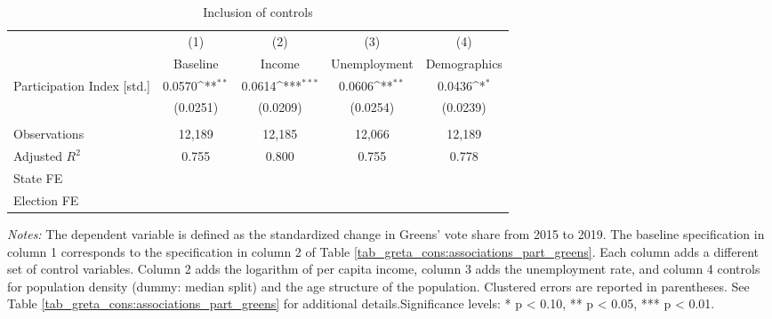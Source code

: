 \begin{table}[H]\centering
	\begin{threeparttable}
		\caption{Inclusion of controls}\label{tab_greta_cons:inclusion_controls}
		{\def\sym#1{\ifmmode^{#1}\else\(^{#1}\)\fi} 
			\begin{tabular}{l*{4}{c}}
				\toprule
				&\multicolumn{1}{c}{(1)}&\multicolumn{1}{c}{(2)}&\multicolumn{1}{c}{(3)}&\multicolumn{1}{c}{(4)}\\
				& Baseline & Income & Unemployment &  Demographics \\
				\midrule
			  Participation Index [std.]&      0.0570\sym{**} &      0.0614\sym{***}&      0.0606\sym{**} &      0.0436\sym{*}  \\
										&    (0.0251)         	&    (0.0209)         &    (0.0254)         &    (0.0239)         \\
				\\
				Observations        	&      12,189         &      12,185         &      12,066         &      12,189         \\
				Adjusted $R^2$         	&       0.755         &       0.800         &       0.755         &       0.778         \\			
				State FE				& \checkmark 		  & \checkmark       & \checkmark 	& \checkmark \\
				Election FE				& \checkmark 		  & \checkmark       & \checkmark   & \checkmark \\
				\bottomrule
		\end{tabular}}
		\begin{tablenotes} 
			\item \scriptsize \emph{Notes:} The dependent variable is defined as the standardized change in Greens' vote share from 2015 to 2019. The baseline specification in column 1 corresponds to the specification in column 2 of Table \ref{tab_greta_cons:associations_part_greens}. Each column adds a different set of control variables. Column 2 adds the logarithm of per capita income, column 3 adds the unemployment rate, and column 4 controls for population density (dummy: median split) and the age structure of the population. Clustered errors are reported in parentheses. See Table \ref{tab_greta_cons:associations_part_greens} for additional details.\newline Significance levels: * p < 0.10, ** p < 0.05, *** p < 0.01.
		\end{tablenotes} 
	\end{threeparttable}
\end{table}





